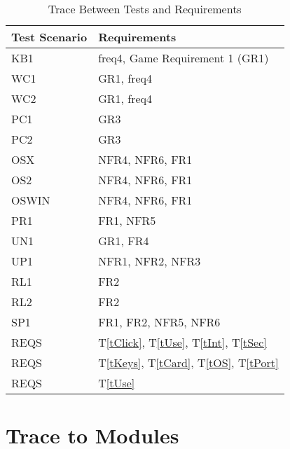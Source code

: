 \documentclass[12pt, titlepage]{article}
\newcommand{\tref}[1]{T\ref{#1}}
\begin{document}
\begin{table}[h]
		\centering
		\begin{tabular}{p{} p{}}
			\toprule
			\textbf{Test Scenario} & \textbf{Requirements}\\
			\midrule
			KB1 & freq4, Game Requirement 1 (GR1)\\
			WC1 & GR1, freq4\\
			WC2 & GR1, freq4\\
			PC1 & GR3\\
			PC2 & GR3\\
			OSX & NFR4, NFR6, FR1\\
			OS2 & NFR4, NFR6, FR1\\
			OSWIN & NFR4, NFR6, FR1\\
			PR1 & FR1, NFR5\\
			UN1 & GR1, FR4\\
			UP1 & NFR1, NFR2, NFR3\\
			RL1 & FR2\\
			RL2 & FR2\\
			SP1 & FR1, FR2, NFR5, NFR6\\
			REQS & \tref{tClick}, \tref{tUse}, \tref{tInt}, \tref{tSec}\\
			REQS & \tref{tKeys}, \tref{tCard}, \tref{tOS}, \tref{tPort}\\
			REQS & \tref{tUse}\\
			\bottomrule
		\end{tabular}
		\caption{Trace Between Tests and Requirements}
		\label{TblRT}
	\end{table}
		
\section{Trace to Modules}		
\end{document}
